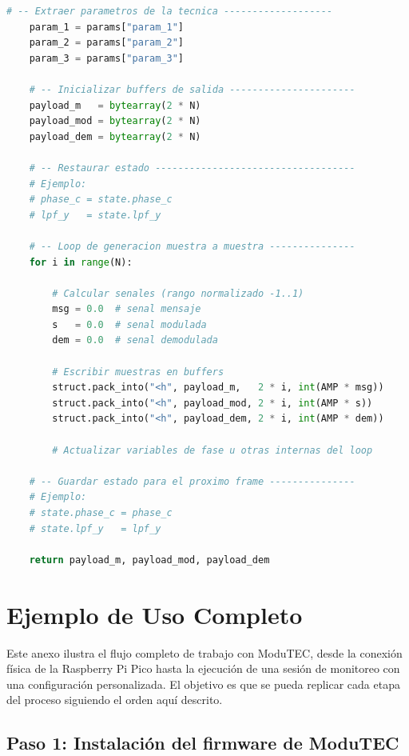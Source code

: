 \documentclass[12pt,letterpaper]{report}
\begin{document}
\begin{lstlisting}[language=Python, caption={TECHNIQUE\_NAME.py - Template}]
    # -- Extraer parametros de la tecnica -------------------
    param_1 = params["param_1"]
    param_2 = params["param_2"]
    param_3 = params["param_3"]

    # -- Inicializar buffers de salida ----------------------
    payload_m   = bytearray(2 * N)
    payload_mod = bytearray(2 * N)
    payload_dem = bytearray(2 * N)

    # -- Restaurar estado -----------------------------------
    # Ejemplo:
    # phase_c = state.phase_c
    # lpf_y   = state.lpf_y

    # -- Loop de generacion muestra a muestra ---------------
    for i in range(N):

        # Calcular senales (rango normalizado -1..1)
        msg = 0.0  # senal mensaje
        s   = 0.0  # senal modulada
        dem = 0.0  # senal demodulada

        # Escribir muestras en buffers
        struct.pack_into("<h", payload_m,   2 * i, int(AMP * msg))
        struct.pack_into("<h", payload_mod, 2 * i, int(AMP * s))
        struct.pack_into("<h", payload_dem, 2 * i, int(AMP * dem))

        # Actualizar variables de fase u otras internas del loop

    # -- Guardar estado para el proximo frame ---------------
    # Ejemplo:
    # state.phase_c = phase_c
    # state.lpf_y   = lpf_y

    return payload_m, payload_mod, payload_dem
\end{lstlisting}

\chapter{Ejemplo de Uso Completo}
\label{ap:ejemplo}

Este anexo ilustra el flujo completo de trabajo con ModuTEC, desde la conexión física
de la Raspberry Pi Pico hasta la ejecución de una sesión de monitoreo con una configuración
personalizada. El objetivo es que se pueda replicar cada etapa del proceso siguiendo el orden
aquí descrito.


\section*{Paso 1: Instalación del firmware de ModuTEC}
\end{document}
